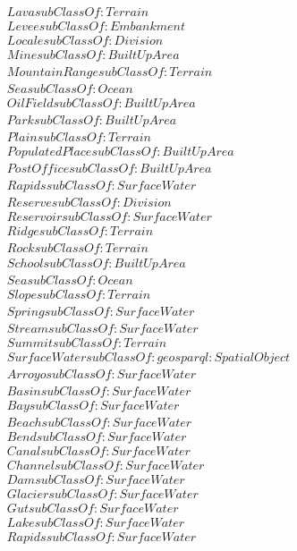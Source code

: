 \begin{align}
  Lava subClassOf: Terrain\\
  Levee subClassOf: Embankment\\
  Locale subClassOf: Division\\
  Mine subClassOf: BuiltUpArea\\
  MountainRange subClassOf: Terrain\\
  Sea subClassOf: Ocean\\
  OilField subClassOf: BuiltUpArea\\
  Park subClassOf: BuiltUpArea\\
  Plain subClassOf: Terrain\\
  PopulatedPlace subClassOf: BuiltUpArea\\
  PostOffice subClassOf: BuiltUpArea\\
  Rapids subClassOf: SurfaceWater\\
  Reserve subClassOf: Division\\
  Reservoir subClassOf: SurfaceWater\\
  Ridge subClassOf: Terrain\\
  Rock subClassOf: Terrain\\
  School subClassOf: BuiltUpArea\\
  Sea subClassOf: Ocean\\
  Slope subClassOf: Terrain\\
  Spring subClassOf: SurfaceWater\\
  Stream subClassOf: SurfaceWater\\
  Summit subClassOf: Terrain\\
  SurfaceWater subClassOf: geosparql:SpatialObject\\
  Arroyo subClassOf: SurfaceWater\\
  Basin subClassOf: SurfaceWater\\
  Bay subClassOf: SurfaceWater\\
  Beach subClassOf: SurfaceWater\\
  Bend subClassOf: SurfaceWater\\
  Canal subClassOf: SurfaceWater\\
  Channel subClassOf: SurfaceWater\\
  Dam subClassOf: SurfaceWater\\
  Glacier subClassOf: SurfaceWater\\
  Gut subClassOf: SurfaceWater\\
  Lake subClassOf: SurfaceWater\\
  Rapids subClassOf: SurfaceWater\\

\end{align}
